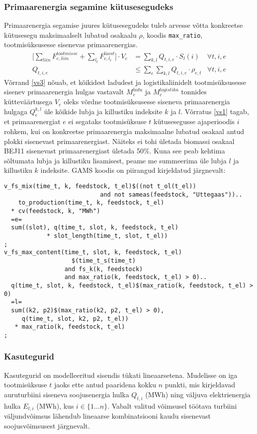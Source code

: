 \documentclass[10pt,a4paper]{article}
\begin{document}
\subsubsection{Primaarenergia segamine kütusesegudeks}
Primaarenergia segamise juures kütusesegudeks tuleb arvesse võtta konkreetse kütusesegu maksimaalselt lubatud osakaalu $\rho$, koodis \texttt{max\_ratio}, tootmisüksusesse sisenevas primaarenergias. 
\begin{align}
\bigg[\sum_{liin} F^{tootmisse}_{e,liin} + \sum_{l_t} F^{laost}_{e,l_t}\bigg]\cdot V_e &= \sum_{k,l} Q_{t,i,e}\cdot S_l(i) &\forall t,i,e \label{vs3} \\
Q_{t,i,e} &\leq \sum_e \sum_{k,l} Q_{t,i,e} \cdot \rho_{e,t} &\forall t,i,e \label{vs1}
\end{align}
Võrrand \eqref{vs3} nõuab, et kõikidest ladudest ja logistikaliinidelt tootmisüksusesse sisenev primaarenergia hulgas vastavalt $M^{ladu}_e$ ja $M^{logistika}_e$ tonnides kütteväärtu\-sega $V_e$ oleks võrdne tootmisüksusesse siseneva primaarenergia hulgaga $Q^{k,l}_e$ üle kõikide lubja ja killustiku indeksite $k$ ja $l$.
Võrratus \eqref{vs1} tagab, et primaarenergiat $e$ ei segataks tootmisüksuse $t$ kütusesegu\-sse ajaperioodis $i$  rohkem, kui on konkreetse primaarenergia maksimaalne lubatud osakaal antud plokki sisenevast primaarenergiast. Näiteks ei tohi ületada biomassi osakaal BEJ11 sisenevast primaarenergiast ületada 50\%. Kuna see peab kehtima sõltumata lubja ja killustiku lisamisest, peame me summeerima üle lubja $l$ ja killustiku $k$ indeksite.
GAMS koodis on piirangud kirjeldatud järgnevalt:
\begin{verbatim}
v_fs_mix(time_t, k, feedstock, t_el)$((not t_ol(t_el))
                           and not sameas(feedstock, "Uttegaas"))..
    to_production(time_t, k, feedstock, t_el)
  * cv(feedstock, k, "MWh")
  =e=
  sum((slot), q(time_t, slot, k, feedstock, t_el)
            * slot_length(time_t, slot, t_el))
;
v_fs_max_content(time_t, slot, k, feedstock, t_el)
                   $(time_t_s(time_t)
                 and fs_k(k, feedstock)
                 and max_ratio(k, feedstock, t_el) > 0)..
  q(time_t, slot, k, feedstock, t_el)$(max_ratio(k, feedstock, t_el) > 0)
  =l=
  sum((k2, p2)$(max_ratio(k2, p2, t_el) > 0),
     q(time_t, slot, k2, p2, t_el))
   * max_ratio(k, feedstock, t_el)
;
\end{verbatim}


\subsubsection{Kasutegurid}
Kasutegurid on modelleeritud sisendis tükati lineaarsetena. Mudelisse on iga tootmis\-üksuse $t$ jaoks ette antud paaridena kokku $n$ punkti,  mis kirjeldavad auruturbiini siseneva soojusenergia hulka $Q_{t,i}$ (MWh) ning väljuva elektrienergia hulka $E_{t,i}$ (MWh), kus $i \in \{1\dots n\}$. Vabalt valitud võimsusel töötava turbiini väljund\-võimsus lähendub lineaarse kombinatsiooni kaudu sisenevast soojusvõimsusest järgnevalt.
 
\end{document}
